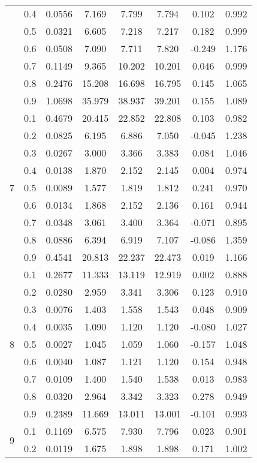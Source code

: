 \documentclass[11pt,a4paper]{report}
\begin{document}
\begin{longtable}{ | c | c || c | c | c | c | c | c | }
 & 0.4 & 0.0556 & 7.169 & 7.799 & 7.794 & 0.102 & 0.992 \\
 & 0.5 & 0.0321 & 6.605 & 7.218 & 7.217 & 0.182 & 0.999 \\
 & 0.6 & 0.0508 & 7.090 & 7.711 & 7.820 & -0.249 & 1.176 \\
 & 0.7 & 0.1149 & 9.365 & 10.202 & 10.201 & 0.046 & 0.999 \\
 & 0.8 & 0.2476 & 15.208 & 16.698 & 16.795 & 0.145 & 1.065 \\
 & 0.9 & 1.0698 & 35.979 & 38.937 & 39.201 & 0.155 & 1.089 \\
 \hline
\multirow{9}{*}{7} & 0.1 & 0.4679 & 20.415 & 22.852 & 22.808 & 0.103 & 0.982 \\
 & 0.2 & 0.0825 & 6.195 & 6.886 & 7.050 & -0.045 & 1.238 \\
 & 0.3 & 0.0267 & 3.000 & 3.366 & 3.383 & 0.084 & 1.046 \\
 & 0.4 & 0.0138 & 1.870 & 2.152 & 2.145 & 0.004 & 0.974 \\
 & 0.5 & 0.0089 & 1.577 & 1.819 & 1.812 & 0.241 & 0.970 \\
 & 0.6 & 0.0134 & 1.868 & 2.152 & 2.136 & 0.161 & 0.944 \\
 & 0.7 & 0.0348 & 3.061 & 3.400 & 3.364 & -0.071 & 0.895 \\
 & 0.8 & 0.0886 & 6.394 & 6.919 & 7.107 & -0.086 & 1.359 \\
 & 0.9 & 0.4541 & 20.813 & 22.237 & 22.473 & 0.019 & 1.166 \\
 \hline
\multirow{9}{*}{8} & 0.1 & 0.2677 & 11.333 & 13.119 & 12.919 & 0.002 & 0.888 \\
 & 0.2 & 0.0280 & 2.959 & 3.341 & 3.306 & 0.123 & 0.910 \\
 & 0.3 & 0.0076 & 1.403 & 1.558 & 1.543 & 0.048 & 0.909 \\
 & 0.4 & 0.0035 & 1.090 & 1.120 & 1.120 & -0.080 & 1.027 \\
 & 0.5 & 0.0027 & 1.045 & 1.059 & 1.060 & -0.157 & 1.048 \\
 & 0.6 & 0.0040 & 1.087 & 1.121 & 1.120 & 0.154 & 0.948 \\
 & 0.7 & 0.0109 & 1.400 & 1.540 & 1.538 & 0.013 & 0.983 \\
 & 0.8 & 0.0320 & 2.964 & 3.342 & 3.323 & 0.278 & 0.949 \\
 & 0.9 & 0.2389 & 11.669 & 13.011 & 13.001 & -0.101 & 0.993 \\
 \hline
\multirow{9}{*}{9} & 0.1 & 0.1169 & 6.575 & 7.930 & 7.796 & 0.023 & 0.901 \\
 & 0.2 & 0.0119 & 1.675 & 1.898 & 1.898 & 0.171 & 1.002 \\

\end{longtable}
\end{document}
